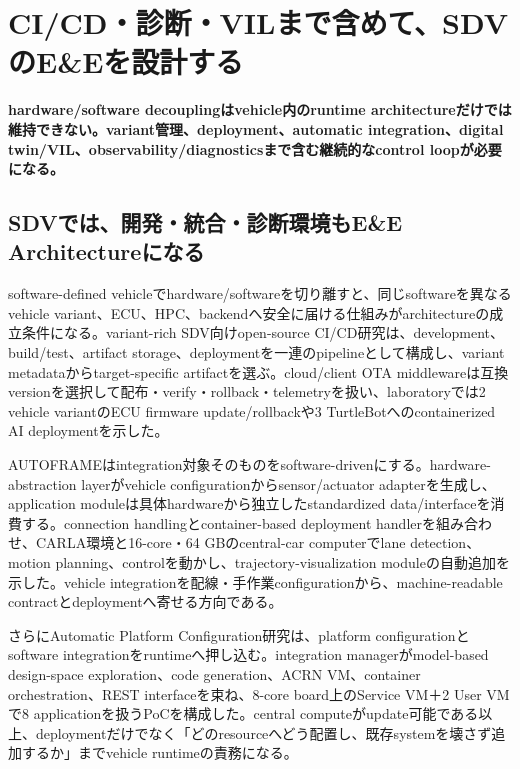 \section{CI/CD・診断・VILまで含めて、SDVのE\&Eを設計する}
\noindent\textbf{hardware/software decouplingはvehicle内のruntime architectureだけでは維持できない。variant管理、deployment、automatic integration、digital twin/VIL、observability/diagnosticsまで含む継続的なcontrol loopが必要になる。}\autocite{src-425ad5d92966,src-8deb33ac8e08,src-e71ad506dc03}

\begin{surveyarticlebody}
\subsection{SDVでは、開発・統合・診断環境もE\&E Architectureになる}

software-defined vehicleでhardware/softwareを切り離すと、同じsoftwareを異なるvehicle variant、ECU、HPC、backendへ安全に届ける仕組みがarchitectureの成立条件になる。variant-rich SDV向けopen-source CI/CD研究は、development、build/test、artifact storage、deploymentを一連のpipelineとして構成し、variant metadataからtarget-specific artifactを選ぶ。cloud/client OTA middlewareは互換versionを選択して配布・verify・rollback・telemetryを扱い、laboratoryでは2 vehicle variantのECU firmware update/rollbackや3 TurtleBotへのcontainerized AI deploymentを示した。\autocite{src-e71ad506dc03}

AUTOFRAMEはintegration対象そのものをsoftware-drivenにする。hardware-abstraction layerがvehicle configurationからsensor/actuator adapterを生成し、application moduleは具体hardwareから独立したstandardized data/interfaceを消費する。connection handlingとcontainer-based deployment handlerを組み合わせ、CARLA環境と16-core・64 GBのcentral-car computerでlane detection、motion planning、controlを動かし、trajectory-visualization moduleの自動追加を示した。vehicle integrationを配線・手作業configurationから、machine-readable contractとdeploymentへ寄せる方向である。\autocite{src-9a94bfb0bd47}

さらにAutomatic Platform Configuration研究は、platform configurationとsoftware integrationをruntimeへ押し込む。integration managerがmodel-based design-space exploration、code generation、ACRN VM、container orchestration、REST interfaceを束ね、8-core board上のService VM＋2 User VMで8 applicationを扱うPoCを構成した。central computeがupdate可能である以上、deploymentだけでなく「どのresourceへどう配置し、既存systemを壊さず追加するか」までvehicle runtimeの責務になる。\autocite{src-8deb33ac8e08}


\end{surveyarticlebody}
